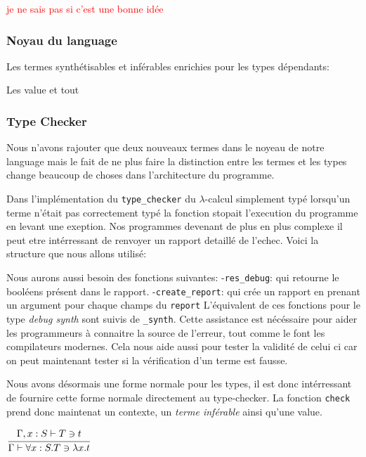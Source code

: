 \documentclass {article}
\newcommand{\codefrom}[3]
           {}
\theoremstyle{definition}
\theoremstyle{remark}
\newcommand{\todo}[1]{\textcolor{red}{#1}}
\newcommand{\fun}[1]{\lstinline!#1!}
\begin{document}
\todo{je ne sais pas si c'est une bonne idée}



\subsubsection{Noyau du language}

Les termes synthétisables et inférables enrichies pour les types dépendants:
\codefrom{dependent}{lambda}{inTm}
\codefrom{dependent}{lambda}{exTm}

Les value et tout

\subsubsection{Type Checker}

Nous n'avons rajouter que deux nouveaux termes dans le noyeau de notre language mais 
le fait de ne plus faire la distinction entre les termes et les types change beaucoup de
choses dans l'architecture du programme. 

Dans l'implémentation du \fun{type_checker} du $\lambda$-calcul simplement typé lorsqu'un terme n'était pas
correctement typé la fonction stopait l'execution du programme en levant une exeption.
Nos programmes devenant de plus en plus complexe il peut etre intérressant de renvoyer un rapport detaillé
de l'echec. Voici la structure que nous allons utilisé:

\codefrom{dependent}{lambda}{debug}

Nous aurons aussi besoin des fonctions suivantes: 
-\fun{res_debug}: qui retourne le booléens présent dans le rapport.    
-\fun{create_report}: qui crée un rapport en prenant un argument pour chaque champs du \fun{report}
L'équivalent de ces fonctions pour le type \emph{debug synth} sont suivis de \fun{_synth}.
Cette assistance est nécéssaire pour aider les programmeurs à connaitre la source de l'erreur,
tout comme le font les compilateurs modernes. Cela nous aide aussi pour tester la validité de celui 
ci car on peut maintenant tester si la vérification d'un terme est fausse.

Nous avons désormais une forme normale pour les types, il est donc intérressant de 
fournire cette forme normale directement au type-checker. La fonction \fun{check} prend donc maintenat
un contexte, un \emph{terme inférable} ainsi qu'une value.


\codefrom{dependent}{lambda}{check_abs}
$\cfrac{\Gamma,x:S\vdash T \ni t}
    {\Gamma \vdash \forall x:S.T \ni \lambda x. t}$
\end{document}
